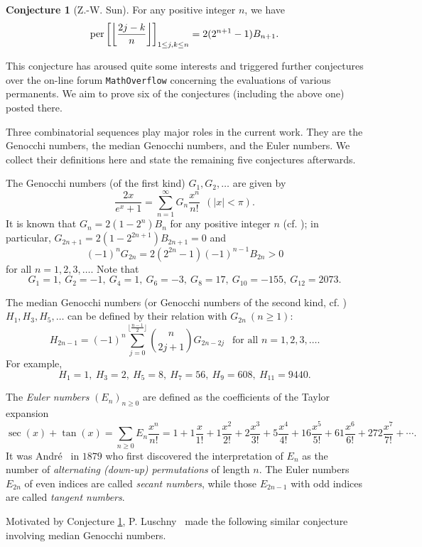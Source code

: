 \documentclass[11pt,reqno]{amsart}
\numberwithin{equation}{section}
\theoremstyle{plain}
\theoremstyle{definition}
\newtheorem{conj}[theorem]{Conjecture}
\def\per{\mathrm{per}}
\def\f{\frac}
\def\per{{\rm per}}
\begin{document}
\begin{conj}[Z.-W. Sun]\label{conj:Sun}
For any positive integer $n$, we have
\begin{align}
\per\left[\left\lfloor\frac{2j-k}{n}\right\rfloor\right]_{1\le j,k\le n}=2(2^{n+1}-1)B_{n+1}.
\end{align}
\end{conj}

This conjecture has aroused quite some interests and triggered further conjectures over the on-line forum {\tt MathOverflow} concerning the evaluations of various permanents. We aim to prove six of the conjectures (including the above one) posted there.

Three combinatorial sequences play major roles in the current work. They are the Genocchi numbers, the median Genocchi numbers, and the Euler numbers. We collect their definitions here and state the remaining five conjectures afterwards.

The Genocchi numbers (of the first kind) $G_1,G_2,\ldots$ are given by
$$\f{2x}{e^x+1}=\sum_{n=1}^\infty G_n\f{x^n}{n!}\ \ (|x|<\pi).$$
It is known that $G_n=2(1-2^n)B_n$ for any positive integer $n$ (cf. \cite[A036968]{oeis});
in particular, $G_{2n+1}=2(1-2^{2n+1})B_{2n+1}=0$
and $$(-1)^nG_{2n}=2(2^{2n}-1)(-1)^{n-1}B_{2n}>0$$
for all $n=1,2,3,\ldots$. Note that
$$G_1=1,\ G_2=-1,\ G_4=1,\ G_6=-3,\ G_8=17,\ G_{10}=-155,\ G_{12}=2073.$$

The median Genocchi numbers (or Genocchi numbers of the second kind, cf. \cite[A005439]{oeis}) $H_1,H_3,H_5,\ldots$ can be defined by their relation with $G_{2n}\ (n\ge1)$:
$$H_{2n-1}=(-1)^n\sum_{j=0}^{\lfloor\frac{n-1}{2}\rfloor}\binom{n}{2j+1}G_{2n-2j}\ \ \text{ for all }n=1,2,3,\ldots.$$
For example,
$$H_1=1,\ H_3=2,\ H_5=8,\ H_7=56,\ H_9=608,\ H_{11}=9440.$$

The {\em Euler numbers} $(E_n)_{n\geq0}$  are defined as the coefficients of the Taylor expansion
$$
\sec(x)+\tan(x)=\sum_{n\geq0} E_n\frac{x^n}{n!}=1+1\frac{x}{1!}+1\frac{x^2}{2!}+2\frac{x^3}{3!}+5\frac{x^4}{4!}+16\frac{x^5}{5!}+ 61\frac{x^6}{6!}+272\frac{x^7}{7!}+\cdots.
$$
It was Andr\'e~\cite{Andre} in $1879$ who first discovered the interpretation of $E_n$ as the number of {\em alternating (down-up) permutations} of length $n$. The Euler numbers $E_{2n}$ of even indices are called {\em secant numbers}, while those $E_{2n-1}$ with odd indices are called {\em tangent numbers}.

Motivated by Conjecture \ref{conj:Sun}, P. Luschny~\cite[A005439]{oeis} made the following similar conjecture involving median Genocchi numbers.
\end{document}
